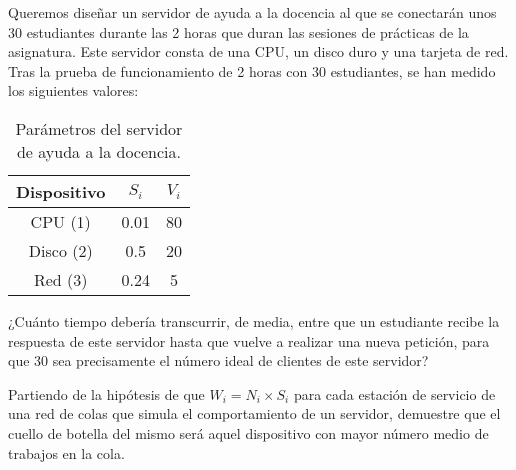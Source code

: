 \begin{ejercicio}\label{ej:5.33}
    Queremos diseñar un servidor de ayuda a la docencia al que se conectarán unos 30 estudiantes durante las 2 horas que duran las sesiones de prácticas de la asignatura. Este servidor consta de una CPU, un disco duro y una tarjeta de red. Tras la prueba de funcionamiento de 2 horas con 30 estudiantes, se han medido los siguientes valores:
    \begin{table}[h]
        \centering
        \begin{tabular}{|c|c|c|}
            \hline
            Dispositivo & $S_i$ & $V_i$ \\
            \hline
            CPU (1) & 0.01 & 80 \\
            Disco (2) & 0.5 & 20 \\
            Red (3) & 0.24 & 5 \\
            \hline
        \end{tabular}
        \caption{Parámetros del servidor de ayuda a la docencia.}
        \label{tab:5.33}
    \end{table}
    ¿Cuánto tiempo debería transcurrir, de media, entre que un estudiante recibe la respuesta de este servidor hasta que vuelve a realizar una nueva petición, para que 30 sea precisamente el número ideal de clientes de este servidor?
\end{ejercicio}
\begin{comment}
\solucion
    El tiempo que debería transcurrir, de media, entre que un estudiante recibe la respuesta de este servidor hasta que vuelve a realizar una nueva petición es de 288 s.
\end{comment}
\begin{ejercicio}\label{ej:5.34}
    Partiendo de la hipótesis de que $W_i = N_i \times S_i$ para cada estación de servicio de una red de colas que simula el comportamiento de un servidor, demuestre que el cuello de botella del mismo será aquel dispositivo con mayor número medio de trabajos en la cola.
\end{ejercicio}
\begin{comment}
\solucion
    Si se cumple dicha hipótesis, usando las leyes operacionales se obtiene que: $Q_i = \frac{U_i^2}{1 - U_i}$. Si $0 < U_i < U_j < 1$, se cumple que a) $U_i^2 < U_j^2$ y b) $(1 - U_i) > (1 - U_j)$. Por lo tanto: $\frac{U_i^2}{1 - U_i} < \frac{U_j^2}{1 - U_j}$ (ya que el numerador en el caso de la estación $j$-ésima será mayor y el denominador menor que en el caso de la estación $i$-ésima). Es decir, la estación de servicio con mayor utilización (es decir, el cuello de botella) también será la que tenga un mayor número de trabajos en la cola. Otra forma de razonar esto último consiste en ver que, en el intervalo $[0, 1[$ (que es el rango en el que se van a mover las utilizaciones), $f(x) = \frac{x^2}{1 - x}$ es una función estrictamente creciente.
\end{comment}





